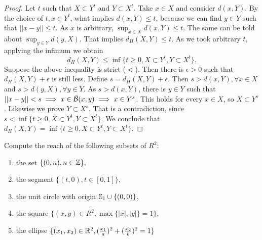 \begin{proof}

Let $t$ such that $X \subset Y^t$ and $Y \subset X^t$. Take $x \in X$ and
consider $d(x,Y)$. By the choice of $t, x \in Y^t$, what implies $d(x,Y) \le
t$, because we can find $y \in Y$ such that $||x - y|| \le t$. As $x$ is
arbitrary, $\sup_{x \in X} d(x,Y) \le t$. The same can be told about $\sup_{y
\in Y} d(y, X)$. That implies $d_H(X,Y) \le t$. As we took arbitrary $t$,
applying the infimum we obtain 
$$d_H(X,Y) \le \inf\{t \ge 0, X \subset Y^t, Y \subset X^t\}.$$
Suppose the above inequality is strict ($<$). Then there is $\epsilon > 0$
such that $d_H(X, Y) + \epsilon$ is still less. Define $s = d_H(X,Y) + \epsilon$. Then $s > d(x,Y), \forall x \in X$ and $s > d(y,
X), \forall y \in Y$. As $s > d(x,Y)$, there is $y \in Y$ such that $||x - y||
< s \implies x \in \bar{\mathcal{B}}(x,y) \implies x \in Y^s$. This holds for every $x
\in X$, so $X \subset Y^s$. Likewise we prove $Y \subset X^s$. That is a
contradiction, since $s < \inf\{t \ge 0, X \subset Y^t, Y \subset X^t\}$. We
conclude that $d_H(X, Y) = \inf\{t \ge 0, X \subset Y^t, Y \subset X^t\}.$  

\end{proof}

\noindent\linia 

\begin{exercise}
    Compute the reach of the following subsets of $R^2$:
    \begin{enumerate}
        \item the set $\{(0, n), n \in \mathbb{Z}\},$
        \item the segment $\{(t, 0), t \in [0, 1]\},$
        \item the unit circle with origin $\mathbb{S}_1 \cup \{(0, 0)\}$,
        \item the square $\{(x, y) \in R^2, \max\{|x|, |y|\}  
        = 1\},$
        \item the ellipse $\{(x_1, x_2) \in \mathbb{R}^2, (\frac{x_1}{a})^2 +
        (\frac{x_2}{b})^2 = 1 \}$
    \end{enumerate}
\end{exercise}

